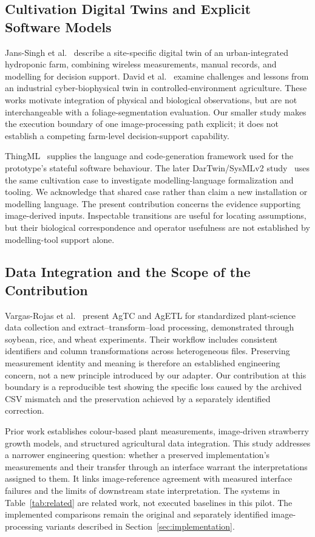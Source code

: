 \documentclass[runningheads]{llncs}
\begin{document}
\subsection{Cultivation Digital Twins and Explicit Software Models}
Jans-Singh et al.~\cite{janssingh2020} describe a site-specific digital twin of an urban-integrated hydroponic farm, combining wireless measurements, manual records, and modelling for decision support. David et al.~\cite{david2023} examine challenges and lessons from an industrial cyber-biophysical twin in controlled-environment agriculture. These works motivate integration of physical and biological observations, but are not interchangeable with a foliage-segmentation evaluation. Our smaller study makes the execution boundary of one image-processing path explicit; it does not establish a competing farm-level decision-support capability.

ThingML~\cite{harrand2016} supplies the language and code-generation framework used for the prototype's stateful software behaviour. The later DarTwin/SysMLv2 study~\cite{dartwin2025} uses the same cultivation case to investigate modelling-language formalization and tooling. We acknowledge that shared case rather than claim a new installation or modelling language. The present contribution concerns the evidence supporting image-derived inputs. Inspectable transitions are useful for locating assumptions, but their biological correspondence and operator usefulness are not established by modelling-tool support alone.

\subsection{Data Integration and the Scope of the Contribution}
Vargas-Rojas et al.~\cite{vargasrojas2024} present AgTC and AgETL for standardized plant-science data collection and extract--transform--load processing, demonstrated through soybean, rice, and wheat experiments. Their workflow includes consistent identifiers and column transformations across heterogeneous files. Preserving measurement identity and meaning is therefore an established engineering concern, not a new principle introduced by our adapter. Our contribution at this boundary is a reproducible test showing the specific loss caused by the archived CSV mismatch and the preservation achieved by a separately identified correction.

Prior work establishes colour-based plant measurements, image-driven strawberry growth models, and structured agricultural data integration. This study addresses a narrower engineering question: whether a preserved implementation's measurements and their transfer through an interface warrant the interpretations assigned to them. It links image-reference agreement with measured interface failures and the limits of downstream state interpretation. The systems in Table~\ref{tab:related} are related work, not executed baselines in this pilot. The implemented comparisons remain the original and separately identified image-processing variants described in Section~\ref{sec:implementation}.
\end{document}
